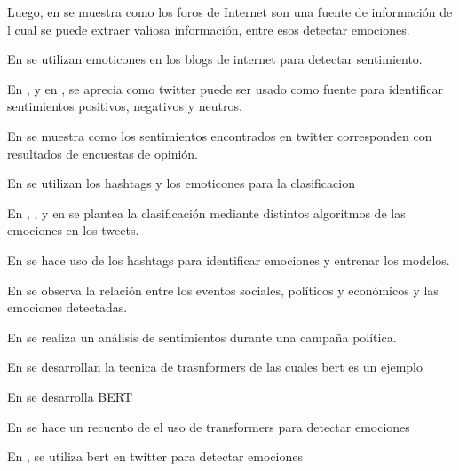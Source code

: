 Luego, en \cite{pang2008opinion} se muestra como los foros de Internet son una fuente de información de l cual se puede extraer valiosa información, entre esos detectar emociones.

En \cite{read2005using} se utilizan emoticones en los blogs de internet para detectar sentimiento.

En \cite{pak2010twitter}, \cite{kouloumpis2011twitter} y en \cite{go2009twitter}, \cite{barbosa2010robust} se aprecia como twitter puede ser usado como fuente para identificar sentimientos positivos, negativos y neutros.

En \cite{o2010tweets} se muestra como los sentimientos encontrados en twitter corresponden con resultados de encuestas de opinión.

En \cite{davidov2010enhanced} se utilizan los hashtags y los emoticones para la clasificacion


En \cite{hasan2014emotex}, , \cite{wang2012harnessing}y en \cite{roberts2012empatweet} se plantea la clasificación mediante distintos algoritmos de las emociones en los tweets.

En \cite{mohammad2012emotional} se hace uso de los hashtags para identificar emociones y entrenar los modelos.

En \cite{bollen2011modeling} se observa la relación entre los eventos sociales, políticos y económicos y las emociones detectadas.

En \cite{tumasjan2010predicting} se realiza un análisis de sentimientos durante una campaña política.

En \cite{vaswani2017attention} se desarrollan la tecnica de trasnformers de las cuales bert es un ejemplo

En \cite{devlin2018bert} se desarrolla BERT

En \cite{acheampong2021transformer} se hace un recuento de el uso de transformers para detectar emociones

En \cite{gonzalez2021twilbert}, \cite{huang2019ana} se utiliza bert en twitter para  detectar emociones








